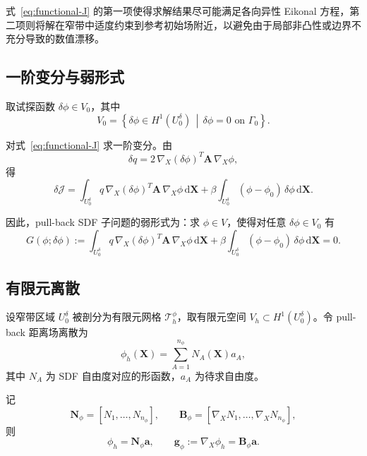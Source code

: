 \documentclass[12pt,a4paper]{ctexart}
\numberwithin{equation}{section}
\newcommand{\cT}{\mathcal{T}}
\newcommand{\cJ}{\mathcal{J}}
\newcommand{\bA}{\bm{A}}
\newcommand{\bg}{\bm{g}}
\newcommand{\bN}{\bm{N}}
\newcommand{\bB}{\bm{B}}
\newcommand{\ba}{\bm{a}}
\newcommand{\bX}{\bm{X}}
\newcommand{\gradX}{\nabla_{\!X}}
\newcommand{\dd}{\,\mathrm{d}}
\begin{document}
式~\eqref{eq:functional-J} 的第一项使得求解结果尽可能满足各向异性 Eikonal 方程，第二项则将解在窄带中适度约束到参考初始场附近，以避免由于局部非凸性或边界不充分导致的数值漂移。

\subsection{一阶变分与弱形式}

取试探函数 $\delta\phi \in V_0$，其中
\begin{equation}
V_0=\left\{\delta\phi\in H^1(U_0^\delta)\,\middle|\,\delta\phi=0\text{ on }\Gamma_0\right\}.
\end{equation}

对式~\eqref{eq:functional-J} 求一阶变分。由
\begin{equation}
\delta q = 2\,\gradX(\delta\phi)^T \bA\,\gradX\phi,
\end{equation}
得
\begin{equation}
\delta \cJ
=
\int_{U_0^\delta}
q\,\gradX(\delta\phi)^T \bA\,\gradX\phi\dd\bX
+
\beta\int_{U_0^\delta}(\phi-\phi_0)\,\delta\phi\dd\bX.
\end{equation}

因此，pull-back SDF 子问题的弱形式为：求 $\phi\in V$，使得对任意 $\delta\phi\in V_0$ 有
\begin{equation}
\boxed{
G(\phi;\delta\phi)
:=
\int_{U_0^\delta}
q\,\gradX(\delta\phi)^T \bA\,\gradX\phi\dd\bX
+
\beta\int_{U_0^\delta}(\phi-\phi_0)\,\delta\phi\dd\bX
=0.
}
\label{eq:weak-sdf}
\end{equation}

\subsection{有限元离散}

设窄带区域 $U_0^\delta$ 被剖分为有限元网格 $\cT_h^\phi$，取有限元空间 $V_h\subset H^1(U_0^\delta)$。令 pull-back 距离场离散为
\begin{equation}
\phi_h(\bX)=\sum_{A=1}^{n_\phi} N_A(\bX) a_A,
\label{eq:phi-fe}
\end{equation}
其中 $N_A$ 为 SDF 自由度对应的形函数，$a_A$ 为待求自由度。

记
\begin{equation}
\bN_\phi = [N_1,\dots,N_{n_\phi}],
\qquad
\bB_\phi = [\gradX N_1,\dots,\gradX N_{n_\phi}],
\end{equation}
则
\begin{equation}
\phi_h = \bN_\phi \ba,
\qquad
\bg_\phi := \gradX\phi_h = \bB_\phi \ba.
\label{eq:phi-gradient-fe}
\end{equation}
\end{document}
